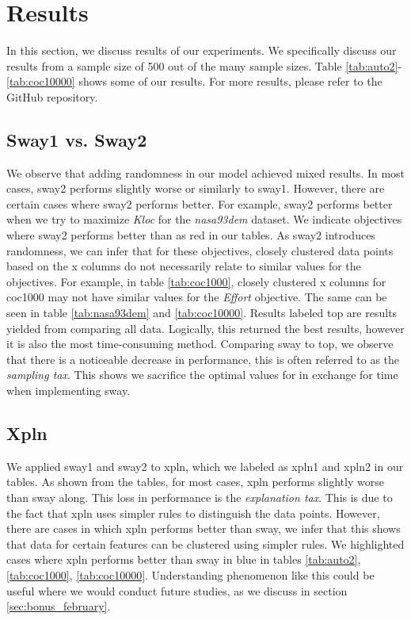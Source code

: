 \section{Results}
\label{sec:results}

In this section, we discuss results of our experiments. We specifically
discuss our
results from a sample size of 500 out of the many sample sizes. 
Table \ref{tab:auto2}-\ref{tab:coc10000} shows some of our results. For
more results, please refer to the GitHub repository.

\subsection{Sway1 vs. Sway2}
  We
  observe that adding randomness in our model achieved mixed results. In
  most cases, sway2 performs slightly worse or similarly to sway1.
  However, there are certain cases where sway2 performs better. For
  example, sway2 performs better when we try to maximize \textit{Kloc} for
  the \textit{nasa93dem} dataset. We indicate objectives where sway2
  performs better than as red in our tables. As sway2 introduces
  randomness, we can infer that 
  for these objectives, closely clustered data points based on the x
  columns do not necessarily relate to similar values for the objectives.
  For example, in table \ref{tab:coc1000}, closely clustered x columns
  for coc1000 may not
  have similar values for the \textit{Effort} objective. 
  The same can be seen in table \ref{tab:nasa93dem} and
  \ref{tab:coc10000}.
  Results labeled top are results yielded from comparing all data.
  Logically, this returned the best results, however it is also the most
  time-consuming method. Comparing sway to top, we observe that there is
  a noticeable decrease in performance, this is often referred to as the
  \textit{sampling tax}. This shows we sacrifice the optimal values for
  in exchange for time when implementing sway. 
  
\subsection{Xpln}
  We applied sway1 and sway2 to xpln, which we labeled as xpln1 and
  xpln2 in our tables. As shown from the tables, for most cases, xpln
  performs slightly worse than sway along. This loss in performance is
  the \textit{explanation tax}. This is due to the fact that xpln uses
  simpler rules to distinguish the data points. However, there are cases
  in which xpln performs better than sway, we infer that this shows that
  data for certain features can be clustered using simpler rules. We
  highlighted cases where xpln performs better than sway in blue in
  tables \ref{tab:auto2}, \ref{tab:coc1000}, \ref{tab:coc10000}.
  Understanding phenomenon like this could be useful where we would
  conduct future studies, as we discuss in section \ref{sec:bonus_february}.

